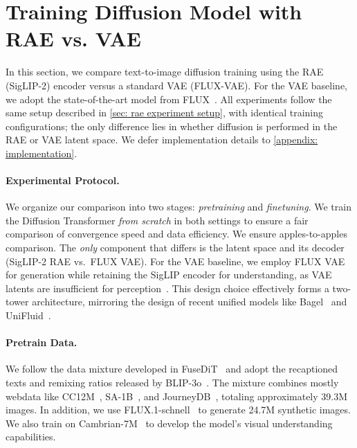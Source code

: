 \documentclass[10pt,twocolumn,letterpaper]{article}
\begin{document}
\section{Training Diffusion Model with RAE vs. VAE}\label{sec: vae vs rae}

In this section, we compare text-to-image diffusion training using the RAE (SigLIP-2) encoder versus a standard VAE (FLUX-VAE). For the VAE baseline, we adopt the state-of-the-art model from FLUX~\citep{flux}. All experiments follow the same setup described in \cref{sec: rae experiment setup}, with identical training configurations; the only difference lies in whether diffusion is performed in the RAE or VAE latent space. We defer implementation details to \cref{appendix: implementation}.


\paragraph{Experimental Protocol.}
We organize our comparison into two stages: \emph{pretraining} and \emph{finetuning}. We train the Diffusion Transformer \emph{from scratch} in both settings to ensure a fair comparison of convergence speed and data efficiency. We ensure apples-to-apples comparison. The \emph{only} component that differs is the latent space and its decoder (SigLIP-2 RAE vs.\ FLUX VAE). 
For the VAE baseline, we employ FLUX VAE for generation while retaining the SigLIP encoder for understanding, as VAE latents are insufficient for perception~\citep{zhou2024transfusion}. This design choice effectively forms a two-tower architecture, mirroring the design of recent unified models like Bagel~\citep{deng2025emerging} and UniFluid~\citep{fan2025unified}.

\paragraph{Pretrain Data.}
We follow the data mixture developed in FuseDiT~\citep{Tang_2025_CVPR} and adopt the recaptioned texts and remixing ratios released by BLIP-3o~\citep{blip3o}. The mixture combines mostly webdata like CC12M~\citep{changpinyo2021conceptual}, SA-1B~\citep{kirillov2023segment}, and JourneyDB~\citep{sun2023journeydb}, totaling approximately 39.3M images. In addition, we use FLUX.1-schnell~\citep{flux} to generate 24.7M synthetic images.
We also train on Cambrian-7M~\citep{tong2024cambrian} to develop the model's visual understanding capabilities.
\end{document}
